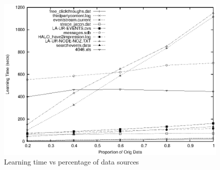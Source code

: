 \begin{figure}[t]
\includegraphics[width=\columnwidth]{scale-uc}
\caption{Learning time vs percentage of data sources}
\label{fig:scale}
\end{figure}


